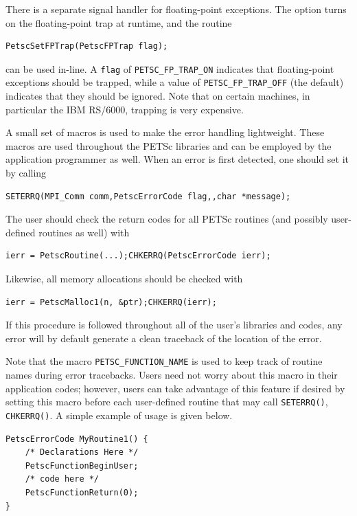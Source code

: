 {{{There is a separate signal handler for floating-point exceptions.
 
The option  turns on the floating-point trap at runtime,
and the routine  
\begin{lstlisting}
PetscSetFPTrap(PetscFPTrap flag);
\end{lstlisting}
can be used in-line.
A \lstinline{flag} of \lstinline{PETSC_FP_TRAP_ON} 
indicates that floating-point exceptions should be trapped,
while a value of \lstinline{PETSC_FP_TRAP_OFF} (the default) indicates that they
should be ignored.  Note that on certain machines, in particular
the IBM RS/6000, trapping is very expensive.

A small set of macros is used to make the error handling lightweight.
These macros are used throughout the PETSc libraries and can be employed
by the application   
programmer as well.  When an error is first detected,
one should set it by calling
\begin{lstlisting}
SETERRQ(MPI_Comm comm,PetscErrorCode flag,,char *message);
\end{lstlisting}
The user should check the return codes for all PETSc routines (and
possibly user-defined routines as well) with
\begin{lstlisting}
ierr = PetscRoutine(...);CHKERRQ(PetscErrorCode ierr);
\end{lstlisting}
Likewise, all memory allocations should be checked with
\begin{lstlisting}
ierr = PetscMalloc1(n, &ptr);CHKERRQ(ierr);
\end{lstlisting}
If this procedure is followed throughout all of the user's libraries
and codes, any error will by default generate a clean traceback of
the location  
of the error.

Note that the macro \lstinline{PETSC_FUNCTION_NAME} is used to keep track of
routine names during error tracebacks.  Users need not worry about this
macro in their application codes; however, users can take advantage of this feature
if desired by setting this macro before each user-defined routine
that may call \lstinline{SETERRQ()}, \lstinline{CHKERRQ()}.
A simple example of usage is given below.
\begin{lstlisting}
PetscErrorCode MyRoutine1() { 
    /* Declarations Here */
    PetscFunctionBeginUser;
    /* code here */
    PetscFunctionReturn(0);
}
\end{lstlisting}

}}}
